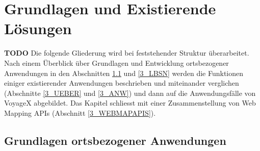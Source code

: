 \newpage
%
%
\enlargethispage{3\baselineskip} %

\section{Grundlagen und Existierende Lösungen}

\textbf{TODO} Die folgende Gliederung wird bei feststehender Struktur überarbeitet.\\
\noindent
Nach einem Überblick über Grundlagen und Entwicklung ortsbezogener Anwendungen in den Abschnitten \ref{3_GRUNDL} und \ref{3_LBSN} werden die Funktionen einiger existierender Anwendungen beschrieben und miteinander verglichen (Abschnitte \ref{3_UEBER} und \ref{3_ANW}) und dann auf die Anwendungsfälle von VoyageX abgebildet. Das Kapitel schliesst mit einer Zusammenstellung von Web Mapping APIs (Abschnitt \ref{3_WEBMAPAPIS}).

\subsection{Grundlagen ortsbezogener Anwendungen}\label{3_GRUNDL}


